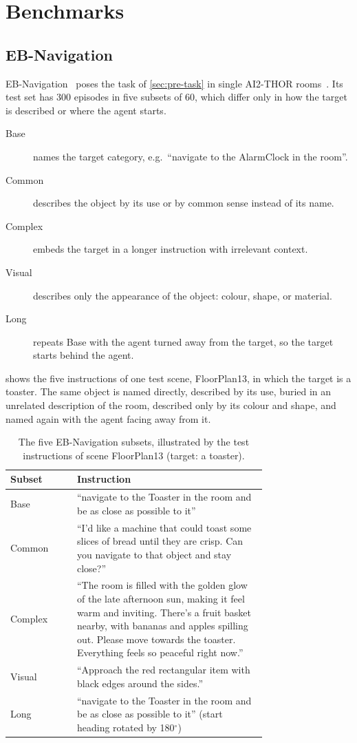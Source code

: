 \section{Benchmarks}
\label{sec:pre-bench}
\subsection{EB-Navigation}
EB-Navigation~\cite{yang2025embodiedbench} poses the task of \cref{sec:pre-task} in single AI2-THOR
rooms~\cite{kolve2017ai2thor}. Its test set has 300 episodes in five subsets of 60, which differ only in how the
target is described or where the agent starts.
\begin{description}
\item[Base] names the target category, e.g.\ ``navigate to the AlarmClock in the room''.
\item[Common] describes the object by its use or by common sense instead of its name.
\item[Complex] embeds the target in a longer instruction with irrelevant context.
\item[Visual] describes only the appearance of the object: colour, shape, or material.
\item[Long] repeats Base with the agent turned away from the target, so the target starts behind the agent.
\end{description}
 shows the five instructions of one test scene, FloorPlan13, in which the target is a toaster. The
same object is named directly, described by its use, buried in an unrelated description of the room, described only
by its colour and shape, and named again with the agent facing away from it.

\begin{table}[htbp]
\centering\small
\caption[The five EB-Navigation subsets]{The five EB-Navigation subsets, illustrated by the test instructions of
scene FloorPlan13 (target: a toaster).}
\label{tab:subsets}
\begin{tabular}{@{}lp{0.74\linewidth}@{}}
\toprule
Subset & Instruction\\
\midrule
Base & ``navigate to the Toaster in the room and be as close as possible to it''\\
Common & ``I'd like a machine that could toast some slices of bread until they are crisp. Can you navigate to that
object and stay close?''\\
Complex & ``The room is filled with the golden glow of the late afternoon sun, making it feel warm and inviting.
There's a fruit basket nearby, with bananas and apples spilling out. Please move towards the toaster. Everything feels
so peaceful right now.''\\
Visual & ``Approach the red rectangular item with black edges around the sides.''\\
Long & ``navigate to the Toaster in the room and be as close as possible to it'' (start heading rotated by
180$^\circ$)\\
\bottomrule
\end{tabular}
\end{table}

